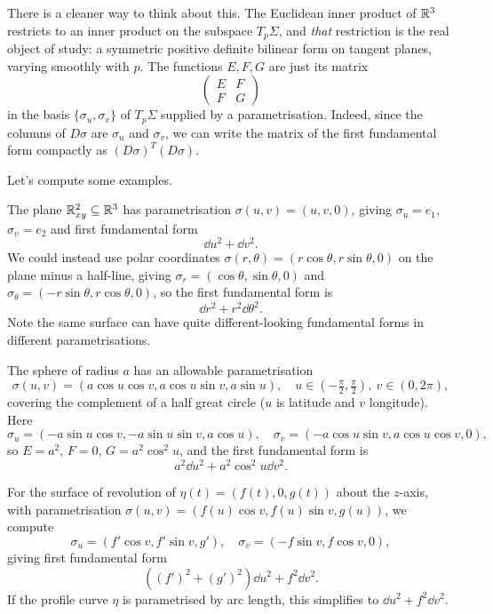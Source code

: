 \documentclass[a4paper]{scrartcl}
\begin{document}
\begin{remark}
    There is a cleaner way to think about this. The Euclidean inner product of $\mathbb{R}^3$ restricts to an inner product on the subspace $T_p \Sigma$, and \emph{that} restriction is the real object of study: a symmetric positive definite bilinear form on tangent planes, varying smoothly with $p$. The functions $E, F, G$ are just its matrix
    $$
    \begin{pmatrix} E & F \\ F & G \end{pmatrix}
    $$
    in the basis $\{\sigma_u, \sigma_v\}$ of $T_p\Sigma$ supplied by a parametrisation. Indeed, since the columns of $D\sigma$ are $\sigma_u$ and $\sigma_v$, we can write the matrix of the first fundamental form compactly as $(D\sigma)^T (D\sigma)$.
\end{remark}

Let's compute some examples.

\begin{example}
    The plane $\mathbb{R}^2_{xy} \subseteq \mathbb{R}^3$ has parametrisation $\sigma(u, v) = (u, v, 0)$, giving $\sigma_u = e_1$, $\sigma_v = e_2$ and first fundamental form
    $$
    \dd u^2 + \dd v^2.
    $$
    We could instead use polar coordinates $\sigma(r, \theta) = (r\cos\theta, r\sin\theta, 0)$ on the plane minus a half-line, giving $\sigma_r = (\cos\theta, \sin\theta, 0)$ and $\sigma_\theta = (-r\sin\theta, r\cos\theta, 0)$, so the first fundamental form is
    $$
    \dd r^2 + r^2 \dd \theta^2.
    $$
    Note the same surface can have quite different-looking fundamental forms in different parametrisations.
\end{example}

\begin{example}\label{ex:sphereFFF}
    The sphere of radius $a$ has an allowable parametrisation
    $$
    \sigma(u, v) = (a \cos u \cos v, a \cos u \sin v, a \sin u), \quad u \in \left(-\tfrac{\pi}{2}, \tfrac{\pi}{2}\right),\ v \in (0, 2\pi),
    $$
    covering the complement of a half great circle ($u$ is latitude and $v$ longitude). Here
    $$
    \sigma_u = (-a\sin u \cos v, -a \sin u \sin v, a \cos u), \quad \sigma_v = (-a \cos u \sin v, a \cos u \cos v, 0),
    $$
    so $E = a^2$, $F = 0$, $G = a^2 \cos^2 u$, and the first fundamental form is
    $$
    a^2 \dd u^2 + a^2 \cos^2 u \dd v^2.
    $$
\end{example}

\begin{example}\label{ex:revolutionFFF}
    For the surface of revolution of $\eta(t) = (f(t), 0, g(t))$ about the $z$-axis, with parametrisation $\sigma(u, v) = (f(u)\cos v, f(u) \sin v, g(u))$, we compute
    $$
    \sigma_u = (f'\cos v, f' \sin v, g'), \quad \sigma_v = (-f \sin v, f\cos v, 0),
    $$
    giving first fundamental form
    $$
    \left((f')^2 + (g')^2\right) \dd u^2 + f^2 \dd v^2.
    $$
    If the profile curve $\eta$ is parametrised by arc length, this simplifies to $\dd u^2 + f^2 \dd v^2$.
\end{example}
\end{document}

